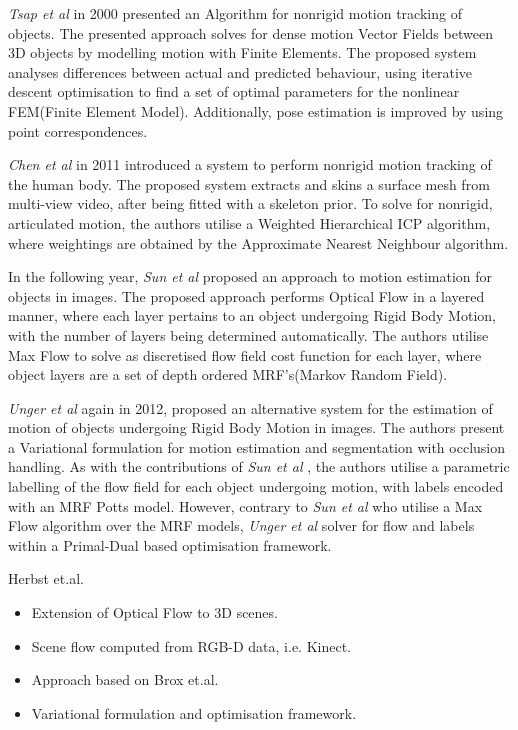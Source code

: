 \textit{Tsap et al} \cite{Tsap2000} in 2000 presented an Algorithm for nonrigid motion 
tracking of objects. The presented approach solves for dense motion Vector Fields between 
3D objects by modelling motion with Finite Elements. The proposed system analyses differences 
between actual and predicted behaviour, using iterative descent optimisation to find a set of 
optimal parameters for the nonlinear FEM(Finite Element Model). Additionally, pose estimation 
is improved by using point correspondences.

\textit{Chen et al} \cite{Chen2011} in 2011 introduced a system to perform nonrigid motion 
tracking of the human body. The proposed system extracts and skins a surface mesh from 
multi-view video, after being fitted with a skeleton prior. To solve for nonrigid, articulated 
motion, the authors utilise a Weighted Hierarchical ICP algorithm, where weightings are obtained 
by the Approximate Nearest Neighbour \cite{ANN} algorithm.

In the following year, \textit{Sun et al} \cite{Sun2012} proposed an approach to motion estimation 
for objects in images. The proposed approach performs Optical Flow in a layered manner, where each 
layer pertains to an object undergoing Rigid Body Motion, with the number of layers being determined 
automatically. The authors utilise Max Flow \cite{MAXFLOW} to solve as discretised flow field cost 
function for each layer, where object layers are a set of depth ordered MRF's(Markov Random Field).

\textit{Unger et al} \cite{Unger2012} again in 2012, proposed an alternative system for the 
estimation of motion of objects undergoing Rigid Body Motion in images. The authors present a 
Variational formulation for motion estimation and segmentation with occlusion handling. As with 
the contributions of \textit{Sun et al} \cite{Sun2012}, the authors utilise a parametric labelling 
of the flow field for each object undergoing motion, with labels encoded with an MRF Potts model.
However, contrary to \textit{Sun et al} \cite{Sun2012} who utilise a Max Flow algorithm over the 
MRF models, \textit{Unger et al} solver for flow and labels within a Primal-Dual based optimisation 
framework.

Herbst et.al. \cite{Herbst2013}
\begin{itemize}
	\item Extension of Optical Flow to 3D scenes.
	\item Scene flow computed from RGB-D data, i.e. Kinect.
	\item Approach based on Brox et.al. \cite{Brox2004}
	\item Variational formulation and optimisation framework.
\end{itemize}

